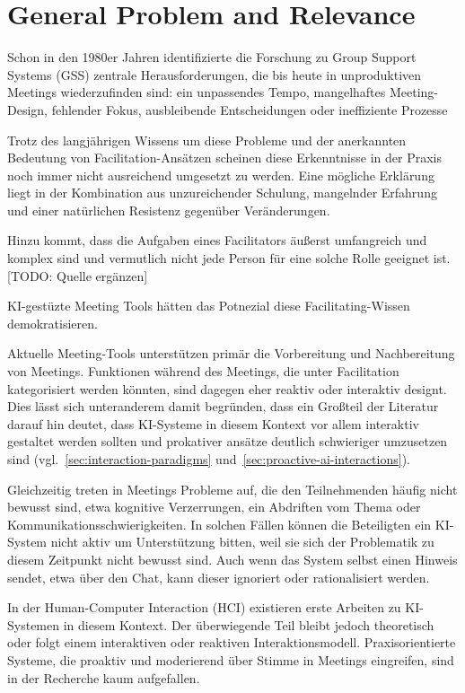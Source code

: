 \section{General Problem and Relevance}

Schon in den 1980er Jahren identifizierte die Forschung zu Group Support Systems (GSS) zentrale
Herausforderungen, die bis heute in unproduktiven Meetings wiederzufinden sind: ein unpassendes Tempo,
mangelhaftes Meeting-Design, fehlender Fokus, ausbleibende Entscheidungen oder ineffiziente Prozesse
\cite[p. 152]{beranekFacilitationGroupSupport1993}

Trotz des langjährigen Wissens um diese Probleme und der anerkannten Bedeutung von Facilitation-Ansätzen
scheinen diese Erkenntnisse in der Praxis noch immer nicht ausreichend umgesetzt zu werden.
Eine mögliche Erklärung liegt in der Kombination aus unzureichender Schulung, mangelnder Erfahrung und einer
natürlichen Resistenz gegenüber Veränderungen. \cite[p. 153]{hayneFacilitatorsPerspectiveMeetings}

Hinzu kommt, dass die Aufgaben eines Facilitators äußerst umfangreich und komplex sind und vermutlich nicht
jede Person für eine solche Rolle geeignet ist. [TODO: Quelle ergänzen]

KI-gestüzte Meeting Tools hätten das Potnezial diese Facilitating-Wissen demokratisieren.

Aktuelle Meeting-Tools unterstützen primär die Vorbereitung und Nachbereitung von Meetings. Funktionen
während des Meetings, die unter Facilitation kategorisiert werden könnten, sind dagegen eher reaktiv oder
interaktiv designt. Dies lässt sich unteranderem damit begründen, dass ein Großteil der Literatur darauf hin
deutet, dass KI-Systeme in diesem Kontext vor allem interaktiv gestaltet werden sollten und prokativer
ansätze deutlich schwieriger umzusetzen sind
(vgl.~\ref{sec:interaction-paradigms} und~\ref{sec:proactive-ai-interactions}).

Gleichzeitig treten in Meetings Probleme auf, die den Teilnehmenden häufig nicht bewusst sind, etwa
kognitive Verzerrungen, ein Abdriften vom Thema oder Kommunikationsschwierigkeiten. In solchen Fällen können
die Beteiligten ein KI-System nicht aktiv um Unterstützung bitten, weil sie sich der Problematik zu diesem
Zeitpunkt nicht bewusst sind. Auch wenn das System selbst einen Hinweis sendet, etwa über den Chat, kann
dieser ignoriert oder rationalisiert werden. \cite["4.4.3
Intervene"]{houttiObserveAskIntervene2025}

In der Human-Computer Interaction (HCI) existieren erste Arbeiten zu KI-Systemen in diesem Kontext. Der
überwiegende Teil bleibt jedoch theoretisch oder folgt einem interaktiven oder reaktiven Interaktionsmodell.
Praxisorientierte Systeme, die proaktiv und moderierend über Stimme in Meetings eingreifen, sind in der
Recherche kaum aufgefallen.

